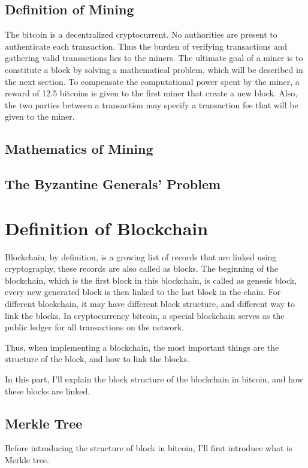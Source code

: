 \documentclass[12pt,a4paper]{article}
\begin{document}
\subsection{Definition of Mining}
The bitcoin is a decentralized cryptocurrent. No authorities are present to authenticate each transaction. Thus the burden of verifying transactions and gathering valid transactions lies to the miners. The ultimate goal of a miner is to constitute a block by solving a mathematical problem, which will be described in the next section. To compensate the computational power spent by the miner, a reward of 12.5 bitcoins is given to the first miner that create a new block. Also, the two parties between a transaction may specify a transaction fee that will be given to the miner. 
\subsection{Mathematics of Mining}
\subsection{The Byzantine Generals' Problem}

\section{Definition of Blockchain}\label{def}
Blockchain, by definition, is a growing list of records that are linked using cryptography, these records are also called as blocks. The beginning of the blockchain, which is the first block in this blockchain, is called as genesis block, every new generated block is then linked to the last block in the chain. For different blockchain, it may have different block structure, and different way to link the blocks. In cryptocurrency bitcoin, a special blockchain serves as the public ledger for all transactions on the network. 

Thus, when implementing a blockchain, the most important things are the structure of the block, and how to link the blocks.

In this part, I'll explain the block structure of the blockchain in bitcoin, and how these blocks are linked.

\subsection{Merkle Tree}

Before introducing the structure of block in bitcoin, I'll first introduce what is Merkle tree.
\end{document}
